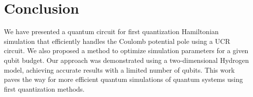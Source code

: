 \documentclass[A4]{article}
\begin{document}
\section{Conclusion}
We have presented a quantum circuit for first quantization Hamiltonian
simulation that efficiently handles the Coulomb potential pole using a UCR
circuit. We also proposed a method to optimize simulation parameters for a given
qubit budget. Our approach was demonstrated using a two-dimensional Hydrogen
model, achieving accurate results with a limited number of qubits. This work
paves the way for more efficient quantum simulations of quantum systems using
first quantization methods.

\printbibliography[heading=bibintoc, title={参考文献}]
\end{document}
